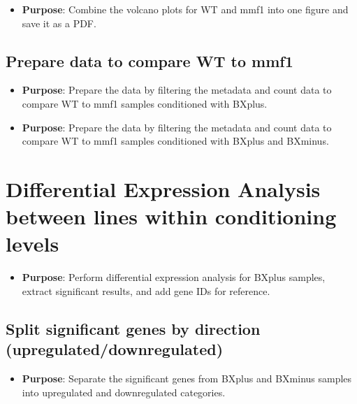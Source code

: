\documentclass[
  11pt,
]{article}
\providecommand{\tightlist}{%
  \setlength{\itemsep}{0pt}\setlength{\parskip}{0pt}}\usepackage{longtable,booktabs,array}
\begin{document}
\begin{itemize}
\tightlist
\item
  \textbf{Purpose}: Combine the volcano plots for WT and mmf1 into one
  figure and save it as a PDF.
\end{itemize}

\subsection{Prepare data to compare WT to
mmf1}\label{prepare-data-to-compare-wt-to-mmf1}

\begin{itemize}
\tightlist
\item
  \textbf{Purpose}: Prepare the data by filtering the metadata and count
  data to compare WT to mmf1 samples conditioned with BXplus.
\end{itemize}

\begin{itemize}
\tightlist
\item
  \textbf{Purpose}: Prepare the data by filtering the metadata and count
  data to compare WT to mmf1 samples conditioned with BXplus and
  BXminus.
\end{itemize}

\section{Differential Expression Analysis between lines within
conditioning
levels}\label{differential-expression-analysis-between-lines-within-conditioning-levels}

\begin{itemize}
\tightlist
\item
  \textbf{Purpose}: Perform differential expression analysis for BXplus
  samples, extract significant results, and add gene IDs for reference.
\end{itemize}

\subsection{Split significant genes by direction
(upregulated/downregulated)}\label{split-significant-genes-by-direction-upregulateddownregulated}

\begin{itemize}
\tightlist
\item
  \textbf{Purpose}: Separate the significant genes from BXplus and
  BXminus samples into upregulated and downregulated categories.
\end{itemize}
\end{document}
